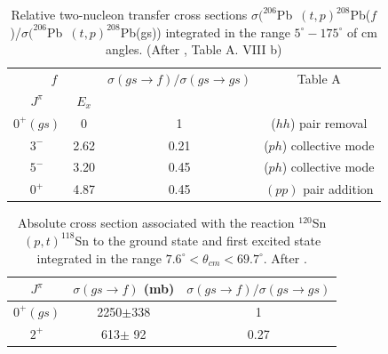     \begin{table}
    	\begin{tabular}{|c|c|c|c|}
    		\hline
    		\multicolumn{2}{|c|}{$f$} & $\sigma(gs\rightarrow f)/\sigma(gs\rightarrow gs)$ & Table A   \\
    		\cline{1-2}
    		$J^{\pi}$& $E_x$ & & \\
    		\hline
    		$0^+(gs)$ & 0& 1&  ($hh$) pair removal\\
    		\hline
    		$3^-$ & 2.62& 0.21& ($ph$) collective mode\\
    		\hline
    		$5^-$ & 3.20& 0.45& ($ph$) collective mode\\
    		\hline
    		$0^+$ & 4.87& 0.45& $(pp)$ pair addition\\
    		\hline
    	\end{tabular}\caption{Relative two-nucleon transfer cross sections \mbox{$\sigma (^{206}$Pb $(t,p)^{208}$Pb($f$)/$\sigma (^{206}$Pb $(t,p)^{208}$Pb(gs))} integrated in the range $5^\circ-175^\circ$ of cm angles. (After \cite{Broglia:73}, Table A. VIII b)}\label{Tab3.B.1}
    \end{table}
    \begin{table}
    	\begin{tabular}{|c|c|c|}
    		\hline
    		$J^{\pi}$& $\sigma(gs\rightarrow f)$ (mb) & $\sigma(gs\rightarrow f)/\sigma(gs\rightarrow gs)$  \\
    		\hline
    		$0^+(gs)$ & 2250$\pm$338& 1\\
    		$2^+$ & 613$\pm$ 92& 0.27\\
    		\hline
    	\end{tabular}\caption{Absolute cross section associated with the reaction $^{120}$Sn $(p,t)^{118}$Sn to the ground state and first excited state integrated in the range $7.6^\circ < \theta_{cm}<69.7^\circ$. After \cite{Guazzoni:08}.}\label{Tab3.B.2}
    \end{table}

